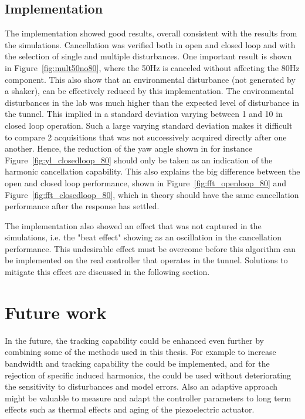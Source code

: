 \subsection{Implementation}
The \abbrRFDC implementation showed good results, overall consistent with the results from the simulations. Cancellation was verified both in open and closed loop and with the selection of single and multiple disturbances. One important result is shown in Figure~\ref{fig:mult50no80}, where the 50Hz is canceled without affecting the 80Hz component. This also show that an environmental disturbance (not generated by a shaker), can be effectively reduced by this implementation. The environmental disturbances in the lab was much higher than the expected level of disturbance in the tunnel. This implied in a standard deviation varying between \unit{1}{\micro\radian} and \unit{10}{\micro\radian} in closed loop operation. Such a large varying standard deviation makes it difficult to compare 2 acquisitions that was not successively acquired directly after one another. Hence, the reduction of the yaw angle shown in for instance Figure~\ref{fig:yl_closedloop_80} should only be taken as an indication of the harmonic cancellation capability. This also explains the big difference between the open and closed loop performance, shown in Figure~\ref{fig:fft_openloop_80} and Figure~\ref{fig:fft_closedloop_80}, which in theory should have the same cancellation performance after the response has settled.

The implementation also showed an effect that was not captured in the simulations, i.e. the "beat effect" showing as an oscillation in the cancellation performance. This undesirable effect must be overcome before this algorithm can be implemented on the real controller that operates in the \abbrLHC tunnel. Solutions to mitigate this effect are discussed in the following section.

\section{Future work}
In the future, the tracking capability could be enhanced even further by combining some of the methods used in this thesis. For example to increase bandwidth and tracking capability the \abbrIRC could be implemented, and for the rejection of specific induced harmonics, the \abbrRFDC could be used without deteriorating the sensitivity to disturbances and model errors. Also an adaptive approach might be valuable to measure and adapt the controller parameters to long term effects such as thermal effects and aging of the piezoelectric actuator.

